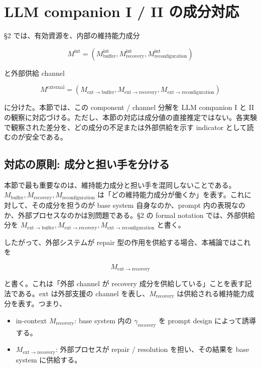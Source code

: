 \documentclass[12pt,a4paper]{article}
\begin{document}
\section{LLM companion I / II の成分対応}\label{llm-companion-i-ii-ux306eux6210ux5206ux5bfeux5fdc}

§2 では、有効資源を、内部の維持能力成分

\[
M^{\mathrm{int}}=(M_{\mathrm{buffer}}^{\mathrm{int}},M_{\mathrm{recovery}}^{\mathrm{int}},M_{\mathrm{reconfiguration}}^{\mathrm{int}})
\]

と外部供給 channel

\[
M^{\mathrm{external}}=(M_{\mathrm{ext}\to\mathrm{buffer}},M_{\mathrm{ext}\to\mathrm{recovery}},M_{\mathrm{ext}\to\mathrm{reconfiguration}})
\]

に分けた。本節では、この component / channel 分解を LLM companion I と II の観察に対応づける。ただし、本節の対応は成分値の直接推定ではない。各実験で観察された差分を、どの成分の不足または外部供給を示す indicator として読むのが安全である。

\subsection{対応の原則: 成分と担い手を分ける}\label{ux5bfeux5fdcux306eux539fux5247-ux6210ux5206ux3068ux62c5ux3044ux624bux3092ux5206ux3051ux308b}

本節で最も重要なのは、維持能力成分と担い手を混同しないことである。\(M_{\mathrm{buffer}}, M_{\mathrm{recovery}}, M_{\mathrm{reconfiguration}}\) は「どの維持能力成分が働くか」を表す。これに対して、その成分を担うのが base system 自身なのか、prompt 内の表現なのか、外部プロセスなのかは別問題である。§2 の formal notation では、外部供給分を \(M_{\mathrm{ext}\to\mathrm{buffer}}, M_{\mathrm{ext}\to\mathrm{recovery}}, M_{\mathrm{ext}\to\mathrm{reconfiguration}}\) と書く。

したがって、外部システムが repair 型の作用を供給する場合、本補論ではこれを

\[
M_{\mathrm{ext}\to\mathrm{recovery}}
\]

と書く。これは「外部 channel が recovery 成分を供給している」ことを表す記法である。\(\mathrm{ext}\) は外部支援の channel を表し、\(M_{\mathrm{recovery}}\) は供給される維持能力成分を表す。つまり、

\begin{itemize}
\tightlist
\item
  in-context \(M_{\mathrm{recovery}}\): base system 内の \(\gamma_{\mathrm{recovery}}\) を prompt design によって誘導する。
\item
  \(M_{\mathrm{ext}\to\mathrm{recovery}}\): 外部プロセスが repair / resolution を担い、その結果を base system に供給する。
\end{itemize}
\end{document}
